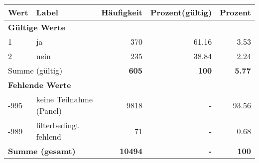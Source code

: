      \begin{longtable}{lXrrr}
     \toprule
     \textbf{Wert} & \textbf{Label} & \textbf{Häufigkeit} & \textbf{Prozent(gültig)} & \textbf{Prozent} \\
     \endhead
     \midrule
     \multicolumn{5}{l}{\textbf{Gültige Werte}}\\

     1 &
     \multicolumn{1}{X}{ ja   } &


       \num{370} &
       \num[round-mode=places,round-precision=2]{61.16} &
         \num[round-mode=places,round-precision=2]{3.53} \\

     2 &
     \multicolumn{1}{X}{ nein   } &


       \num{235} &
       \num[round-mode=places,round-precision=2]{38.84} &
         \num[round-mode=places,round-precision=2]{2.24} \\
     \midrule
     \multicolumn{2}{l}{Summe (gültig)} &
       \textbf{\num{605}} &
     \textbf{\num{100}} &
       \textbf{\num[round-mode=places,round-precision=2]{5.77}} \\
     \multicolumn{5}{l}{\textbf{Fehlende Werte}}\\
       -995 &
       keine Teilnahme (Panel) &
         \num{9818} &
        - &
         \num[round-mode=places,round-precision=2]{93.56} \\
       -989 &
       filterbedingt fehlend &
         \num{71} &
        - &
         \num[round-mode=places,round-precision=2]{0.68} \\
     \midrule
     \multicolumn{2}{l}{\textbf{Summe (gesamt)}} &
          \textbf{\num{10494}} &
        \textbf{-} &
        \textbf{\num{100}} \\
     \bottomrule
     \end{longtable}
     
